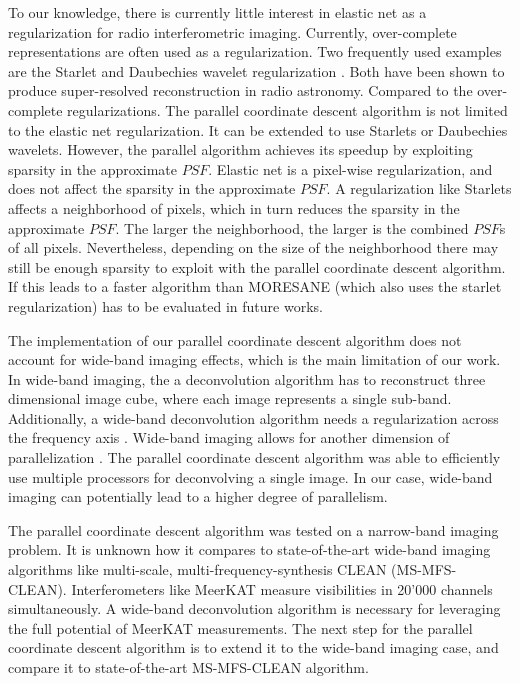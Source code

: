 To our knowledge, there is currently little interest in elastic net as a regularization for radio interferometric imaging. Currently, over-complete representations are often used as a regularization. Two frequently used examples are the Starlet \cite{starck2015starlet} and Daubechies wavelet regularization \cite{carrillo2014purify}. Both have been shown to produce super-resolved reconstruction in radio astronomy\cite{girard2015sparse, dabbech2018cygnus}. Compared to the over-complete regularizations. The parallel coordinate descent algorithm is not limited to the elastic net regularization. It can be extended to use Starlets or Daubechies wavelets. However, the parallel algorithm achieves its speedup by exploiting sparsity in the approximate $PSF$. Elastic net is a pixel-wise regularization, and does not affect the sparsity in the approximate $PSF$. A regularization like Starlets affects a neighborhood of pixels, which in turn reduces the sparsity in the approximate $PSF$. The larger the neighborhood, the larger is the combined $PSF$s of all pixels. Nevertheless, depending on the size of the neighborhood there may still be enough sparsity to exploit with the parallel coordinate descent algorithm. If this leads to a faster algorithm than MORESANE (which also uses the starlet regularization) has to be evaluated in future works.

The implementation of our parallel coordinate descent algorithm does not account for wide-band imaging effects, which is the main limitation of our work. In wide-band imaging, the a deconvolution algorithm has to reconstruct three dimensional image cube, where each image represents a single sub-band. Additionally, a wide-band deconvolution algorithm needs a regularization across the frequency axis \cite{ferrari2015multi}. Wide-band imaging allows for another dimension of parallelization \cite{ferrari2015multi}. The parallel coordinate descent algorithm was able to efficiently use multiple processors for deconvolving a single image. In our case, wide-band imaging can potentially lead to a higher degree of parallelism.

The parallel coordinate descent algorithm was tested on a narrow-band imaging problem. It is unknown how it compares to state-of-the-art wide-band imaging algorithms like multi-scale, multi-frequency-synthesis CLEAN (MS-MFS-CLEAN). Interferometers like MeerKAT measure visibilities in 20'000 channels simultaneously. A wide-band deconvolution algorithm is necessary for leveraging the full potential of MeerKAT measurements. The next step for the parallel coordinate descent algorithm is to extend it to the wide-band imaging case, and compare it to state-of-the-art MS-MFS-CLEAN algorithm.
 

